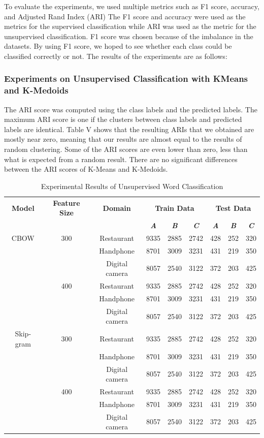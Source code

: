 \documentclass[a4paper,conference]{IEEEtran}
\begin{document}
To evaluate the experiments, we used multiple metrics such as F1 score, accuracy, and Adjusted Rand Index (ARI) The F1 score and accuracy were used as the metrics for the supervised classification while ARI was used as the metric for the unsupervised classification. F1 score was chosen because of the imbalance in the datasets. By using F1 score, we hoped to see whether each class could be classified correctly or not. The results of the experiments are as follows:

\subsubsection{Experiments on Unsupervised Classification with KMeans and K-Medoids}
The ARI score was computed using the class labels and the predicted labels. The maximum ARI score is one if the clusters between class labels and predicted labels are identical. Table V shows that the resulting ARIs that we obtained are mostly near zero, meaning that our results are almost equal to the results of random clustering. Some of the ARI scores are even lower than zero, less than what is expected from a random result. There are no significant differences between the ARI scores of K-Means and K-Medoids.

\begin{table}[htbp]
\caption{Experimental Results of Unsupervised Word Classification}
\begin{center}
\begin{tabular}{|c|c|c|c|c|c|c|c|c|}
\hline
\textbf{Model}&\textbf{Feature Size}&\textbf{Domain}&\multicolumn{3}{|c|}{\textbf{Train Data}}&\multicolumn{3}{|c|}{\textbf{Test Data}}\\
\cline{4-9}
& & & \textbf{\textit{A}}& \textbf{\textit{B}}&\textbf{\textit{C}}& \textbf{\textit{A}}&\textbf{\textit{B}}& \textbf{\textit{C}}\\
\hline
CBOW&300&Restaurant&9335&2885&2742&428&252&320 \\
\hline
&&Handphone&8701&3009&3231&431&219&350 \\
\hline
&&Digital camera&8057&2540&3122&372&203&425 \\
\hline
&400&Restaurant&9335&2885&2742&428&252&320 \\
\hline
&&Handphone&8701&3009&3231&431&219&350 \\
\hline
&&Digital camera&8057&2540&3122&372&203&425 \\
\hline
Skip-gram&300&Restaurant&9335&2885&2742&428&252&320 \\
\hline
&&Handphone&8701&3009&3231&431&219&350 \\
\hline
&&Digital camera&8057&2540&3122&372&203&425 \\
\hline
&400&Restaurant&9335&2885&2742&428&252&320 \\
\hline
&&Handphone&8701&3009&3231&431&219&350 \\
\hline
&&Digital camera&8057&2540&3122&372&203&425 \\
\hline
\end{tabular}
\label{tab4}
\end{center}
\end{table}
\end{document}
